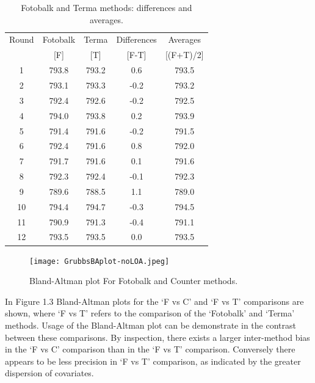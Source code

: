 \documentclass[12pt, a4paper]{report}
\theoremstyle{plain}
\theoremstyle{definition}
\theoremstyle{remark}
\begin{document}
\begin{table}[h!]
\renewcommand\arraystretch{0.7}%
\begin{center}
\begin{tabular}{|c||c|c||c|c|}
  \hline
 Round & Fotobalk  & Terma  & Differences  & Averages  \\
  &  [F] & [T] & [F-T] &  [(F+T)/2] \\
  \hline
1 & 793.8 & 793.2 & 0.6 & 793.5 \\
  2 & 793.1 & 793.3 & -0.2 & 793.2 \\
  3 & 792.4 & 792.6 & -0.2 & 792.5 \\
  4 & 794.0 & 793.8 & 0.2 & 793.9 \\
  5 & 791.4 & 791.6 & -0.2 & 791.5 \\
  6 & 792.4& 791.6 & 0.8 & 792.0 \\
  7 & 791.7 & 791.6 & 0.1 & 791.6 \\
  8 & 792.3 & 792.4 & -0.1 & 792.3 \\
  9 & 789.6 & 788.5 & 1.1 & 789.0 \\
  10 & 794.4 & 794.7 & -0.3 & 794.5 \\
  11 & 790.9 & 791.3 & -0.4 & 791.1 \\
  12 & 793.5 & 793.5 & 0.0 & 793.5 \\

   \hline
\end{tabular}
\caption{Fotobalk and Terma methods: differences and averages.}
\end{center}
\end{table}

\newpage

\begin{figure}[h!]
\begin{center}
  \texttt{[image: GrubbsBAplot-noLOA.jpeg]}
  \caption{Bland-Altman plot For Fotobalk and Counter methods.}\label{GrubbsBA-noLOA}
\end{center}
\end{figure}



In Figure 1.3 Bland-Altman plots for the `F vs C' and `F vs T'
comparisons are shown, where `F vs T' refers to the comparison of
the `Fotobalk' and `Terma' methods. Usage of the Bland-Altman plot
can be demonstrate in the contrast between these comparisons. By inspection, there exists a larger inter-method bias in the `F vs C' comparison than in the `F vs T' comparison. Conversely there
appears to be less precision in `F vs T' comparison, as indicated
by the greater dispersion of covariates.
\end{document}

